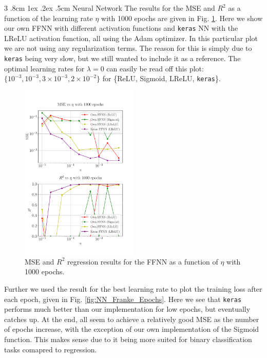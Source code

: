 \documentclass[%
reprint,s
amsmath,amssymb,
aps,
]{revtex4-2}
\makeatletter
\renewcommand{\subsubsection}{%
	\@startsection
	{subsubsection}%
	{3}%
	{\z@}%
	{.8cm \@plus1ex \@minus .2ex}%
	{.5cm}%
	{\normalfont\small\centering}%
}
\makeatother
\begin{document}
\subsubsection{Neural Network}
The results for the MSE and $R^2$ as a function of the learning rate $\eta$ with 1000 epochs are given in Fig. \ref{fig:NN_Franke_LR_1000}. Here we show our own FFNN with different activation functions and \texttt{keras} NN with the LReLU activation function, all using the Adam optimizer. In this particular plot we are not using any regularization terms. The reason for this is simply due to \texttt{keras} being very slow, but we still wanted to include it as a reference. The optimal learning rates for $\lambda=0$ can easily be read off this plot: $\{10^{-3},10^{-3},3\times10^{-3},2\times 10^{-2}\}$ for \{ReLU, Sigmoid, LReLU, \texttt{keras}\}.
\begin{figure}[ht!]
	\includegraphics[width=0.5\textwidth]{Figures/NN_MSE_R2_Franke_LearningRate_Epochs1000.pdf}
	\caption{MSE and $R^2$ regression results for the FFNN as a function of $\eta$ with 1000 epochs.}
	\label{fig:NN_Franke_LR_1000}
\end{figure}

Further we used the result for the best learning rate to plot the training loss after each epoch, given in Fig. \ref{fig:NN_Franke_Epochs}. Here we see that \texttt{keras} performs much better than our implementation for low epochs, but eventually catches up. At the end, all seem to achieve a relatively good MSE as the number of epochs increase, with the exception of our own implementation of the Sigmoid function. This makes sense due to it being more suited for binary classification tasks comapred to regression.
\end{document}
